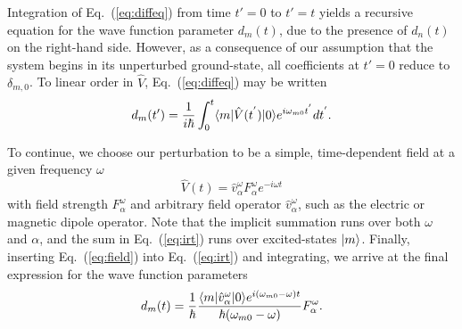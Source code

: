 {{Integration of Eq.~(\ref{eq:diffeq}) from time $t' = 0$ to $t' = t$ yields a recursive equation for the 
wave function parameter $d_m(t)$, due to the presence of $d_n(t)$ on the right-hand side. 
However, as a consequence of our assumption that the system begins in its unperturbed ground-state, all
coefficients at $t' = 0$ reduce to $\delta_{m,0}$. To linear order in $\hat{V}$, Eq.~(\ref{eq:diffeq}) may be written
\begin{equation} \label{eq:irt}
    d_m(t') = \frac{1}{i\hbar}\int_0^t\langle m |\hat{V}(t^{'})| 0 \rangle e^{i\omega_{m0}t^{'}}dt^{'}.
\end{equation}

To continue, we choose our perturbation to be a simple, time-dependent field at a given frequency $\omega$ 
\begin{equation} \label{eq:field}
\hat{V}(t) = \hat{v}^\omega_\alpha F^\omega_\alpha e^{-i\omega t}
\end{equation}
with field strength $F^\omega_\alpha$ and arbitrary field operator $\hat{v}^\omega_\alpha$, such as the electric or magnetic dipole operator. 
Note that the implicit summation runs over both $\omega$ and $\alpha$, and the sum in Eq.~(\ref{eq:irt}) runs over excited-states $| m \rangle$.
Finally, inserting Eq.~(\ref{eq:field}) into Eq.~(\ref{eq:irt}) and integrating, we arrive at the final expression for the
wave function parameters
\begin{equation} \label{eq:sot}
    \begin{aligned}
        d_m(t) = \frac{1}{\hbar}\frac{\langle m |\hat{v}^\omega_\alpha| 0 \rangle e^{i(\omega_{m0}-\omega)t}}{\hbar(\omega_{m0}-\omega)}F^{\omega}_{\alpha}.
    \end{aligned}
\end{equation}
 
}}
